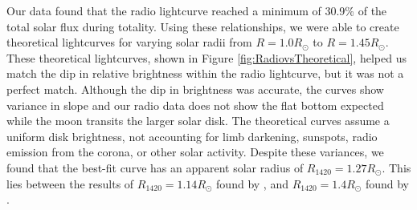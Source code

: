Our data found that the radio lightcurve reached a minimum of 30.9\% of the total solar flux during totality.
Using these relationships, we were able to create theoretical lightcurves for varying solar radii from $R = 1.0 R_{\odot}$ to $R = 1.45 R_{\odot}$.
These theoretical lightcurves, shown in Figure \ref{fig:RadiovsTheoretical}, helped us match the dip in relative brightness within the radio lightcurve, but it was not a perfect match.
Although the dip in brightness was accurate, the curves show variance in slope and our radio data does not show the flat bottom expected while the moon transits the larger solar disk.
The theoretical curves assume a uniform disk brightness, not accounting for limb darkening, sunspots, radio emission from the corona, or other solar activity.
Despite these variances, we found that the best-fit curve has an apparent solar radius of $R_{\mathrm{1420}} = 1.27 R_{\odot}$.
This lies between the results of $R_{\mathrm{1420}} = 1.14 R_{\odot}$ found by \cite{messerotti_radio_2000}, and $R_{\mathrm{1420}} = 1.4 R_{\odot}$ found by \cite{leung_solar_2022}.
